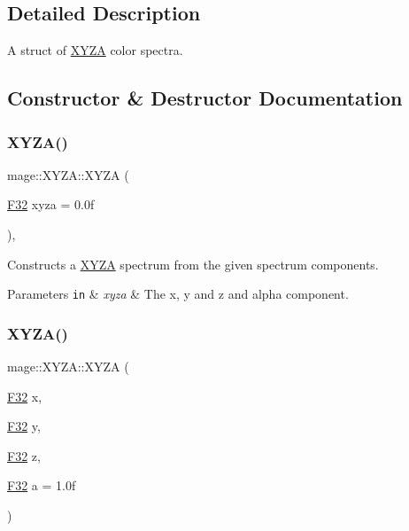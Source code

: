 \subsection{Detailed Description}
A struct of \hyperlink{structmage_1_1_x_y_z_a}{X\+Y\+ZA} color spectra. 

\subsection{Constructor \& Destructor Documentation}
\hypertarget{structmage_1_1_x_y_z_a_af2ffae1531c19dc3db28c8b778aa1bf9}{}\label{structmage_1_1_x_y_z_a_af2ffae1531c19dc3db28c8b778aa1bf9} 
\subsubsection{\texorpdfstring{X\+Y\+Z\+A()}{XYZA()}\hspace{0.1cm}{\footnotesize\ttfamily [1/8]}}
{\footnotesize\ttfamily mage\+::\+X\+Y\+Z\+A\+::\+X\+Y\+ZA (\begin{DoxyParamCaption}\item[{\hyperlink{namespacemage_aa97e833b45f06d60a0a9c4fc22ae02c0}{F32}}]{xyza = {\ttfamily 0.0f} }\end{DoxyParamCaption})\hspace{0.3cm}{\ttfamily [explicit]}, {\ttfamily [noexcept]}}

Constructs a \hyperlink{structmage_1_1_x_y_z_a}{X\+Y\+ZA} spectrum from the given spectrum components.


\begin{DoxyParams}[1]{Parameters}
\mbox{\tt in}  & {\em xyza} & The x, y and z and alpha component. \\
\hline
\end{DoxyParams}
\hypertarget{structmage_1_1_x_y_z_a_a580f9d9583741a67a8285460e7ddb5e3}{}\label{structmage_1_1_x_y_z_a_a580f9d9583741a67a8285460e7ddb5e3} 
\subsubsection{\texorpdfstring{X\+Y\+Z\+A()}{XYZA()}\hspace{0.1cm}{\footnotesize\ttfamily [2/8]}}
{\footnotesize\ttfamily mage\+::\+X\+Y\+Z\+A\+::\+X\+Y\+ZA (\begin{DoxyParamCaption}\item[{\hyperlink{namespacemage_aa97e833b45f06d60a0a9c4fc22ae02c0}{F32}}]{x,  }\item[{\hyperlink{namespacemage_aa97e833b45f06d60a0a9c4fc22ae02c0}{F32}}]{y,  }\item[{\hyperlink{namespacemage_aa97e833b45f06d60a0a9c4fc22ae02c0}{F32}}]{z,  }\item[{\hyperlink{namespacemage_aa97e833b45f06d60a0a9c4fc22ae02c0}{F32}}]{a = {\ttfamily 1.0f} }\end{DoxyParamCaption})\hspace{0.3cm}{\ttfamily [noexcept]}}

